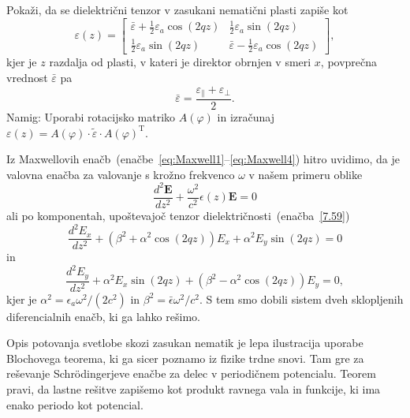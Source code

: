 \begin{definition}
Pokaži, da se dielektrični tenzor v zasukani nematični plasti zapiše kot
\begin{equation}
\varepsilon (z)=\left[\begin{array}{cc}
\bar{\varepsilon}+\frac{1}{2}\varepsilon_{a}\cos(2qz) & \frac{1}{2}\varepsilon_{a}\sin(2qz)\\
\frac{1}{2}\varepsilon_{a}\sin(2qz) & \bar{\varepsilon}-\frac{1}{2}\varepsilon_{a}\cos(2qz)
\end{array}\right],
\label{7.59}
\end{equation}
kjer  je $z$ razdalja od plasti, v kateri je direktor
obrnjen v smeri $x$, povprečna vrednost $\bar{\varepsilon}$ pa  
\begin{equation}
\bar{\varepsilon}=\frac{\varepsilon_{\parallel}+\varepsilon_{\perp}}{2}.
\label{7.60}
\end{equation}
Namig: Uporabi rotacijsko matriko $A(\varphi)$ in izračunaj  $\varepsilon (z) = A(\varphi) \cdot 
\tilde{\varepsilon} \cdot A(\varphi)^\mathrm{T}$.
\end{definition}

Iz Maxwellovih enačb~(enačbe~\ref{eq:Maxwell1}--\ref{eq:Maxwell4}) 
hitro uvidimo, da je valovna enačba
za valovanje s krožno frekvenco $\omega$ v našem primeru oblike
\begin{equation}
\frac{d^{2}\mathbf{E}}{dz^{2}}+\frac{\omega^{2}}{c^{2}} \epsilon
(z)\mathbf{E}=0
\label{7.61}
\end{equation}
ali po komponentah, upoštevajoč tenzor dielektričnosti~(enačba~\ref{7.59})
\begin{equation}
\frac{d^{2}E_{x}}{dz^{2}} + 
(\beta^{2}+\alpha^{2}\cos(2qz))E_{x}+\alpha^{2}E_{y}\sin(2qz) = 0
\label{7.62a}
\end{equation}
in 
\begin{equation}
\frac{d^{2}E_{y}}{dz^{2}} +
\alpha^{2}E_{x}\sin(2qz)+(\beta^{2}-\alpha^{2}\cos(2qz))E_{y} = 0,
\label{7.62b}
\end{equation}
kjer je $\alpha^{2}=\epsilon_{a}\omega^{2}/(2c^{2})$ in 
$\beta^{2}=\bar{\epsilon}\omega^{2}/c^{2}$. S tem smo dobili sistem
dveh sklopljenih diferencialnih enačb, ki ga lahko rešimo.
\begin{remark}
Opis potovanja svetlobe skozi zasukan nematik je lepa ilustracija uporabe 
Blochovega teorema, ki ga sicer poznamo iz fizike trdne snovi. Tam gre za 
reševanje Schr\"odingerjeve enačbe za delec v periodičnem potencialu. Teorem pravi, 
da lastne rešitve zapišemo kot produkt ravnega vala in funkcije, ki ima enako 
periodo kot potencial.
\end{remark}

